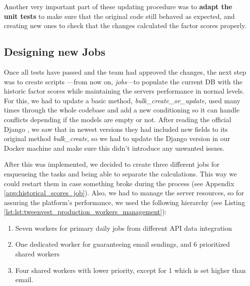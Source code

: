 \documentclass[11pt,english,a4paper,hidelinks]{book}
\begin{document}
\vspace{0.5cm}
\noindent Another very important part of these updating procedure was to \textbf{adapt the unit tests} to make sure that the original code still behaved as expected, and creating new ones to check that the changes calculated the factor scores properly.

\subsection{Designing new Jobs}

Once all tests have passed and the team had approved the changes, the next step was to create scripts —from now on, \textit{jobs}—to populate the current DB with the historic factor scores while maintaining the servers performance in normal levels. For this, we had to update a basic method, \textit{bulk\_create\_or\_update}, used many times through the whole codebase and add a new conditioning so it can handle conflicts depending if the models are empty or not. After reading the official Django \textcite{django2025queryset}, we saw that in newest versions they had included new fields to its original method \textit{bulk\_create}, so we had to update the Django version in our Docker machine and make sure this didn't introduce any unwanted issues.

\vspace{0.5cm}
\noindent After this was implemented, we decided to create three different jobs for enqueueing the tasks and being able to separate the calculations. This way we could restart them in case something broke during the process (see Appendix \ref{app:historical_scores_job}). Also, we had to manage the server resources, so for assuring the platform's performance, we used the following hierarchy (see Listing \ref{lst:lst:tweenvest_production_workers_management}):
\begin{enumerate}
    \item Seven workers for primary daily jobs from different API data integration
    \item One dedicated worker for guaranteeing email sendings, and 6 prioritized shared workers
    \item Four shared workers with lower priority, except for 1 which is set higher than email.
\end{enumerate}
\end{document}
